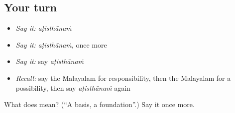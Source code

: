 \subsection*{Your turn}
\begin{itemize}
\raggedright
  \item \emph{Say it:} \emph{aṭisthānaṁ}
  \item \emph{Say it:} \emph{aṭisthānaṁ}, once more
  \item \emph{Say it:} say \emph{aṭisthānaṁ}
  \item \emph{Recall:} say the Malayalam for responsibility, then the Malayalam for a possibility, then say \emph{aṭisthānaṁ} again
\end{itemize}

\begin{tcolorbox}[breakable,colback=teal!4,colframe=teal!35!black,title={Before you move on}]
What does  mean? (\textquotedblleft{}A basis, a foundation\textquotedblright{}.) Say it once more.
\end{tcolorbox}
